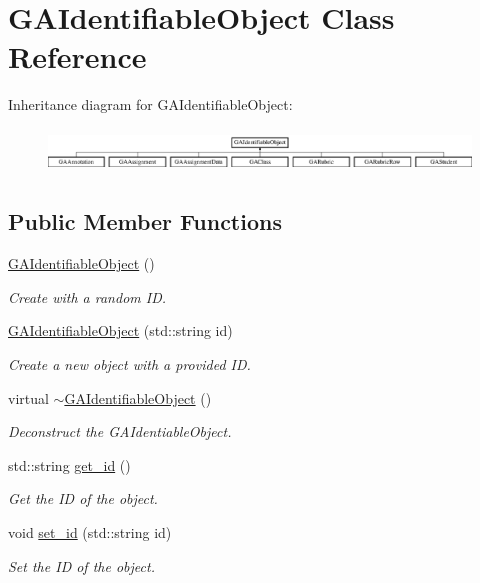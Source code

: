 \hypertarget{class_g_a_identifiable_object}{}\section{G\+A\+Identifiable\+Object Class Reference}
\label{class_g_a_identifiable_object}
Inheritance diagram for G\+A\+Identifiable\+Object\+:\begin{figure}[H]
\begin{center}
\leavevmode
\includegraphics[height=1.176471cm]{class_g_a_identifiable_object}
\end{center}
\end{figure}
\subsection*{Public Member Functions}
\begin{DoxyCompactItemize}
\item 
\hyperlink{class_g_a_identifiable_object_a22300b23e98b09ca27b87f50cecdd1da}{G\+A\+Identifiable\+Object} ()
\begin{DoxyCompactList}\small\item\em Create with a random ID. \end{DoxyCompactList}\item 
\hyperlink{class_g_a_identifiable_object_a80ca248b066ca01681ebbc89a7f32c03}{G\+A\+Identifiable\+Object} (std\+::string id)
\begin{DoxyCompactList}\small\item\em Create a new object with a provided ID. \end{DoxyCompactList}\item 
\mbox{\label{class_g_a_identifiable_object_ae9fef38488c8d16b03bb0cfffd600259}} 
virtual \hyperlink{class_g_a_identifiable_object_ae9fef38488c8d16b03bb0cfffd600259}{$\sim$\+G\+A\+Identifiable\+Object} ()
\begin{DoxyCompactList}\small\item\em Deconstruct the G\+A\+Identiable\+Object. \end{DoxyCompactList}\item 
std\+::string \hyperlink{class_g_a_identifiable_object_afdd3c5022366b4e963c2b194f55c9400}{get\+\_\+id} ()
\begin{DoxyCompactList}\small\item\em Get the ID of the object. \end{DoxyCompactList}\item 
void \hyperlink{class_g_a_identifiable_object_a6b0a4580ef8e6e3f9b0a39fbc9d424e0}{set\+\_\+id} (std\+::string id)
\begin{DoxyCompactList}\small\item\em Set the ID of the object. \end{DoxyCompactList}\end{DoxyCompactItemize}


